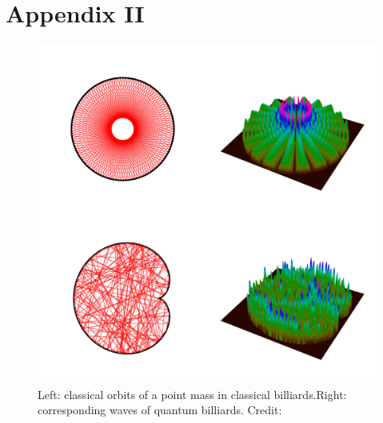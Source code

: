 \section*{Appendix II}
\begin{figure}[H]
\includegraphics[width=\textwidth]{2}
\caption{Left: classical orbits of a point mass in classical billiards.Right: corresponding waves of quantum billiards. Credit:\cite{berry358}}
\label{fig:2}
\end{figure}
